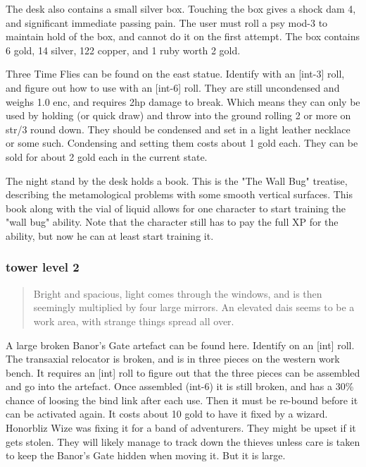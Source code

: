 \documentclass[11pt, twoside, titlepage, a4paper]{report}
\newenvironment{readoutloud}%
{\begin{quote}\begin{itshape}}%
{\end{itshape}\end{quote}}%
\begin{document}
The desk also contains a small silver box. Touching the box gives a shock dam 4, and significant immediate passing pain. The user must roll a psy mod-3 to maintain hold of the box, and cannot do it on the first attempt. The box contains 6 gold, 14 silver, 122 copper, and 1 ruby worth 2 gold.

Three Time Flies can be found on the east statue. Identify with an [int-3] roll, and figure out how to use with an [int-6] roll. They are still uncondensed and weighs 1.0 enc, and requires 2hp damage to break. Which means they can only be used by holding (or quick draw) and throw into the ground rolling 2 or more on str/3 round down. They should be condensed and set in a light leather necklace or some such. Condensing and setting them costs about 1 gold each. They can be sold for about 2 gold each in the current state.

The night stand by the desk holds a book. This is the "The Wall Bug" treatise, describing the metamological problems with some smooth vertical surfaces. This book along with the vial of liquid allows for one character to start training the "wall bug" ability. Note that the character still has to pay the full XP for the ability, but now he can at least start training it.


\subsubsection*{tower level 2}
\begin{readoutloud}
Bright and spacious, light comes through the windows, and is then seemingly multiplied by four large mirrors. An elevated dais seems to be a work area, with strange things spread all over.
\end{readoutloud}

A large broken Banor's Gate artefact can be found here. Identify on an [int] roll. The transaxial relocator is broken, and is in three pieces on the western work bench. It requires an [int] roll to figure out that the three pieces can be assembled and go into the artefact.
Once assembled (int-6) it is still broken, and has a 30\% chance of loosing the bind link after each use. Then it must be re-bound before it can be activated again.
It costs about 10 gold to have it fixed by a wizard.
Honorbliz Wize was fixing it for a band of adventurers. They might be upset if it gets stolen. They will likely manage to track down the thieves unless care is taken to keep the Banor's Gate hidden when moving it. But it is large.
\end{document}
